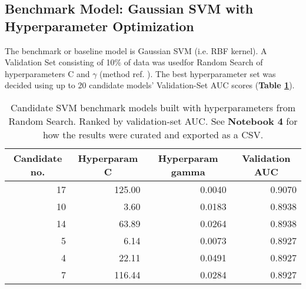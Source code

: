 \documentclass[11pt]{diazessay}
\begin{document}

\subsection{Benchmark Model: Gaussian SVM with Hyperparameter Optimization}

The benchmark or baseline model is Gaussian SVM (i.e. RBF kernel). A Validation Set consisting of 10\% of data was usedfor Random Search of hyperparameters C and $\gamma$ (method ref. \cite{Stackoverflow2020}). The best hyperparameter set was decided using up to 20 candidate models' Validation-Set AUC scores (\textbf{Table \ref{table:svmhpo}}).

\begin{table}[h]
	\centering
	\caption{Candidate SVM benchmark models built with hyperparameters from Random Search. Ranked by validation-set AUC. See \textbf{Notebook 4} for how the results were curated and exported as a CSV.} \label{table:svmhpo}
	\begin{tabular}{@{}rrrr@{}}
		\toprule
		\multicolumn{1}{c}{\textbf{Candidate no.}} & \multicolumn{1}{c}{\textbf{Hyperparam C}} & \multicolumn{1}{c}{\textbf{Hyperparam gamma}} & \multicolumn{1}{c}{\textbf{Validation AUC}} \\ \midrule
		17                                         & 125.00                                    & 0.0040                                        & 0.9070                                        \\
		10                                         & 3.60                                      & 0.0183                                        & 0.8938                                        \\
		14                                         & 63.89                                     & 0.0264                                        & 0.8938                                        \\
		5                                          & 6.14                                      & 0.0073                                        & 0.8927                                        \\
		4                                          & 22.11                                     & 0.0491                                        & 0.8927                                        \\
		7                                          & 116.44                                    & 0.0284                                        & 0.8927                                        \\

\end{tabular}
\end{table}
\end{document}
